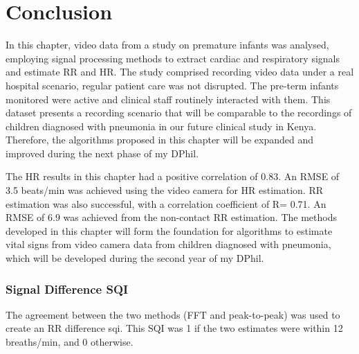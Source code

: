 \section{Conclusion}


In this chapter, video data from a study on premature infants was analysed, employing signal processing methods to extract cardiac and respiratory signals and estimate RR and HR. The study comprised recording video data under a real hospital scenario, regular patient care was not disrupted. The pre-term infants monitored were active and clinical staff routinely interacted with them. This dataset presents a recording scenario that will be comparable to the recordings of children diagnosed with pneumonia in our future clinical study in Kenya. Therefore, the algorithms proposed in this chapter will be expanded and improved during the next phase of my DPhil.

The HR results in this chapter had a positive correlation of 0.83. An RMSE of 3.5 beats/min was achieved using the video camera for HR estimation. RR estimation was also successful, with a correlation coefficient of R= 0.71. An RMSE of 6.9 was achieved from the non-contact RR estimation. The methods developed in this chapter will form the foundation for algorithms to estimate vital signs from video camera data from children diagnosed with pneumonia, which will be developed during the second year of my DPhil.


\iffalse
\label{RR methodology}
Section ~\ref{sec:camera_rr_est_overview} outlines the overall methodology used to estimate RR from within an ROI, selected as in section~\ref{roirr}. Section~\ref{filteringrr} presents the filters used to process the extracted signals while section ~\ref{RR_peaks2peak} explains algorithms used for peak detection. Section~\ref{rrsqi} discusses the different SQIs used to discard noisy data. The results for this RR estimation process are presented in section~\ref{rrestimates}.
\fi

\iffalse
 \subsubsection{FFT estimation}
Each 40s window, sliding by 5s, was de-trended and a Fast Fourier Transform (FFT) applied as in Fig.~\ref{peak} panel b. The frequency of the FFT peak with the greatest power was taken as an estimate for the RR frequency in that window.
\fi

\iffalse
\subsubsection{Signal Difference SQI}
The agreement between the two methods (FFT and peak-to-peak) was used to create an RR difference \gls{sqi}. This SQI was 1 if the two estimates were within 12 breaths/min, and 0 otherwise.

